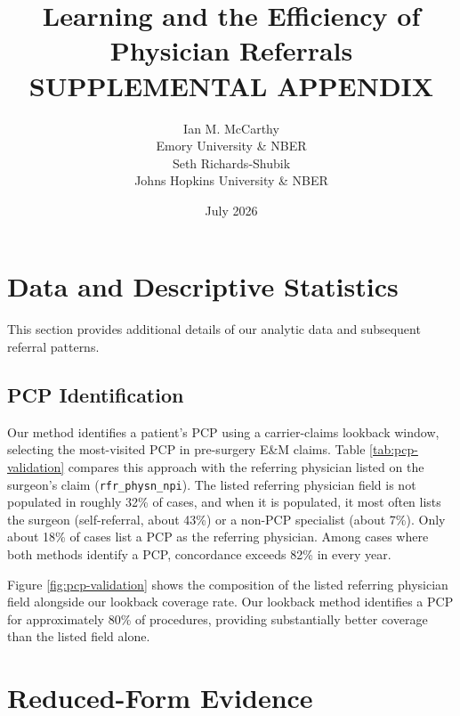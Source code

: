 \documentclass[12pt]{article}
\begin{document}
\title{Learning and the Efficiency of Physician Referrals \\
SUPPLEMENTAL APPENDIX}
\author{%
  Ian M. McCarthy \\[-1.5ex]
  Emory University \& NBER \\
  Seth Richards-Shubik \\[-1.5ex]
  Johns Hopkins University \& NBER
}
\date{July 2026}
\maketitle


\section{Data and Descriptive Statistics}
\label{app:desc}

This section provides additional details of our analytic data and subsequent referral patterns.

\subsection{PCP Identification}
\label{app:pcp-validation}

Our method identifies a patient's PCP using a carrier-claims lookback window, selecting the most-visited PCP in pre-surgery E\&M claims. Table \ref{tab:pcp-validation} compares this approach with the referring physician listed on the surgeon's claim (\texttt{rfr\_physn\_npi}). The listed referring physician field is not populated in roughly 32\% of cases, and when it is populated, it most often lists the surgeon (self-referral, about 43\%) or a non-PCP specialist (about 7\%). Only about 18\% of cases list a PCP as the referring physician. Among cases where both methods identify a PCP, concordance exceeds 82\% in every year.

Figure \ref{fig:pcp-validation} shows the composition of the listed referring physician field alongside our lookback coverage rate. Our lookback method identifies a PCP for approximately 80\% of procedures, providing substantially better coverage than the listed field alone.



\section{Reduced-Form Evidence}
\label{app:reduced-form}
\end{document}
